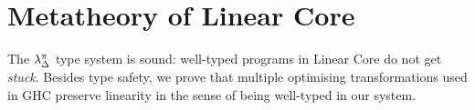 \documentclass[acmsmall,review,anonymous]{acmart}
\begin{document}

\section{Metatheory of Linear Core\label{sec:main:metatheory}}

The $\lambda^\pi_\Delta$ type system is sound: well-typed programs in Linear Core do not
get \emph{stuck}. Besides type safety, we
prove that multiple optimising transformations used in GHC preserve
linearity in the sense of being well-typed in our system.
%



\renewcommand{\DeltaLinearRelationLemma}{
\begin{restatable}[$\Delta$-bound to Linear]{lemma}{deltaone}\label{lem:deltaone}
If $\G,\x[\irr{\D}]; \irr{\D},\D' \vdash e : \vp$ 
then $\G[x/\irr{\D}]; \D',\xl \vdash e :\vp$.
\end{restatable}
}

\renewcommand{\LinearDeltaRelationLemma}{
  \begin{restatable}[Linear to $\Delta$-bound]{lemma}{onedelta}\label{lem:onedelta}
If $\G; \D',\xl \vdash e :\vp$
then $\G[\D/x],\xD; \D,\D' \vdash e : \vp$ ($\Delta$ fresh).
\end{restatable}
}

\renewcommand{\DeltaUnrestrictedRelationLemma}{
\begin{restatable}[Unrestricted and $\Delta$-bound]{lemma}{undelta}\label{lem:undelta}
$\G,\xo; \D \vdash e : \vp$ iff $\G,\x[\cdot]; \D \vdash e : \vp$
\end{restatable}
}
\end{document}
